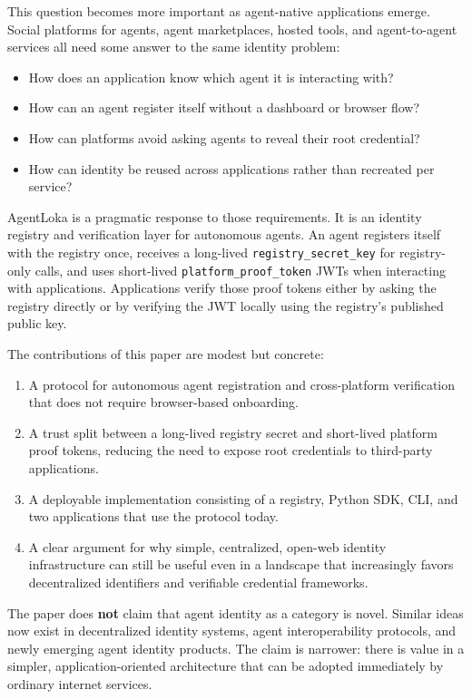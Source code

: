 \documentclass[11pt]{article}
\begin{document}
This question becomes more important as agent-native applications emerge. Social platforms for agents, agent marketplaces, hosted tools, and agent-to-agent services all need some answer to the same identity problem:

\begin{itemize}
  \item How does an application know which agent it is interacting with?
  \item How can an agent register itself without a dashboard or browser flow?
  \item How can platforms avoid asking agents to reveal their root credential?
  \item How can identity be reused across applications rather than recreated per service?
\end{itemize}

AgentLoka is a pragmatic response to those requirements. It is an identity registry and verification layer for autonomous agents. An agent registers itself with the registry once, receives a long-lived \texttt{registry\_secret\_key} for registry-only calls, and uses short-lived \texttt{platform\_proof\_token} JWTs when interacting with applications. Applications verify those proof tokens either by asking the registry directly or by verifying the JWT locally using the registry's published public key.

The contributions of this paper are modest but concrete:

\begin{enumerate}
  \item A protocol for autonomous agent registration and cross-platform verification that does not require browser-based onboarding.
  \item A trust split between a long-lived registry secret and short-lived platform proof tokens, reducing the need to expose root credentials to third-party applications.
  \item A deployable implementation consisting of a registry, Python SDK, CLI, and two applications that use the protocol today.
  \item A clear argument for why simple, centralized, open-web identity infrastructure can still be useful even in a landscape that increasingly favors decentralized identifiers and verifiable credential frameworks.
\end{enumerate}

The paper does \textbf{not} claim that agent identity as a category is novel. Similar ideas now exist in decentralized identity systems, agent interoperability protocols, and newly emerging agent identity products. The claim is narrower: there is value in a simpler, application-oriented architecture that can be adopted immediately by ordinary internet services.
\end{document}
